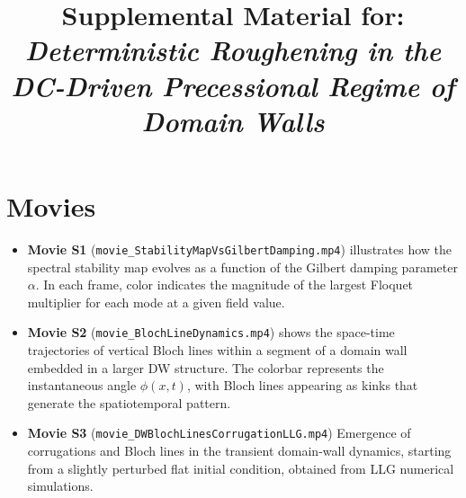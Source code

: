 \documentclass[aps,prb,onecolumn,superscriptaddress]{revtex4-2}
\begin{document}

\title{Supplemental Material for: \\ \textit{Deterministic Roughening in the DC-Driven Precessional Regime of Domain Walls}}
\maketitle
\section{Movies}

\begin{itemize}
\item \textbf{Movie S1} (\texttt{movie\_StabilityMapVsGilbertDamping.mp4}) illustrates how the spectral stability map evolves as a function of the Gilbert damping parameter $\alpha$. In each frame, color indicates the magnitude of the largest Floquet multiplier for each mode at a given field value.
\item \textbf{Movie S2} (\texttt{movie\_BlochLineDynamics.mp4}) shows the space-time trajectories of vertical Bloch lines within a segment of a domain wall embedded in a larger DW structure. The colorbar represents the instantaneous angle $\phi(x,t)$, with Bloch lines appearing as kinks that generate the spatiotemporal pattern.
\item \textbf{Movie S3} (\texttt{movie\_DWBlochLinesCorrugationLLG.mp4}) 
Emergence of corrugations and Bloch lines in the transient domain-wall dynamics, starting from a slightly perturbed flat initial condition, obtained from LLG numerical simulations.
\end{itemize}
\end{document}
